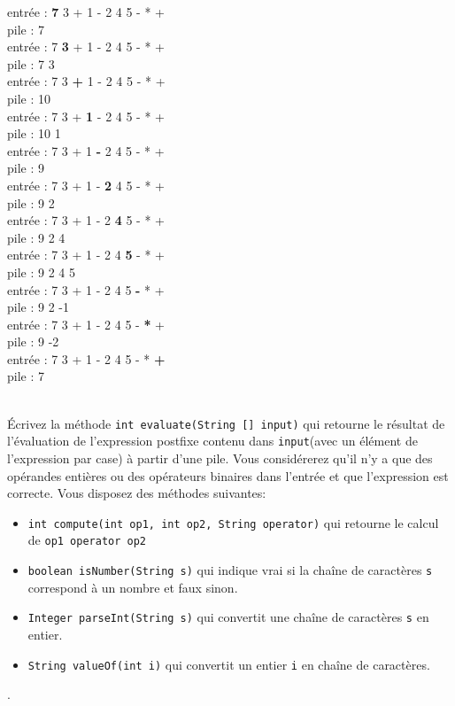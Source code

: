 \documentclass[iutinfo, a4paper, nocorrections, 10pt]{ustl-tdtp}
\begin{document}
\begin{solution}
{\color{red}
entrée : \textbf{7} 3 + 1 - 2 4 5 - * +  \\
pile : 7 
\\
entrée : 7 \textbf{3} + 1 - 2 4 5 - * +  \\
pile : 7 3 
\\
entrée : 7 3 \textbf{+} 1 - 2 4 5 - * +  \\
pile : 10
\\
entrée : 7 3 + \textbf{1} - 2 4 5 - * +  \\
pile : 10 1
\\
entrée : 7 3 + 1 \textbf{-} 2 4 5 - * +  \\
pile : 9
\\
entrée : 7 3 + 1 - \textbf{2} 4 5 - * +  \\
pile : 9 2 
\\
entrée : 7 3 + 1 - 2 \textbf{4} 5 - * +  \\
pile : 9 2 4
\\
entrée : 7 3 + 1 - 2 4 \textbf{5} - * +  \\
pile : 9 2 4 5
\\
entrée : 7 3 + 1 - 2 4 5 \textbf{-} * +  \\
pile : 9 2 -1
\\
entrée : 7 3 + 1 - 2 4 5 - \textbf{*} +  \\
pile : 9 -2
\\
entrée : 7 3 + 1 - 2 4 5 - * \textbf{+}  \\
pile : 7
\\
}
\end{solution}

~\\ \question Écrivez la méthode \texttt{int evaluate(String [] input)} qui retourne le résultat de l'évaluation de l'expression postfixe contenu dans \texttt{input}(avec un élément de l'expression par case) à partir d'une pile. Vous considérerez qu'il n'y a que des opérandes entières ou des opérateurs binaires dans l'entrée et que l'expression est correcte. Vous disposez des méthodes suivantes:
\begin{itemize}
\item \texttt{int compute(int op1, int op2, String operator)} qui retourne le calcul de \texttt{op1 operator op2} 
\item \texttt{boolean isNumber(String s)} qui indique vrai si la chaîne de caractères \texttt{s} correspond à un nombre et faux sinon.
\item \texttt{Integer parseInt(String s)} qui convertit une chaîne de caractères \texttt{s} en entier.
\item \texttt{String valueOf(int i)} qui convertit un entier \texttt{i} en chaîne de caractères.
\end{itemize}.
\end{document}
